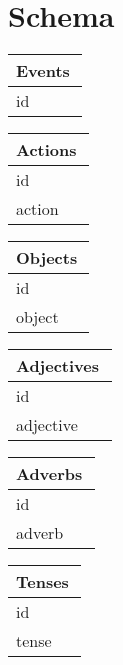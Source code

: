 \documentclass[10pt]{article}
\begin{document}
\section{Schema}
\begin{multicols}{2}

\begin{tabular}{|p{0.95\linewidth}|} 
\hline                   
\textbf{Events}
\\
\hline
id\\
\hline
\end{tabular}



\begin{tabular}{|p{0.95\linewidth}|} 
\hline                   
\textbf{Actions}
\\
\hline
id\\
\hline
action\\
\hline
\end{tabular}



\begin{tabular}{|p{0.95\linewidth}|} 
\hline                   
\textbf{Objects}
\\
\hline
id\\
\hline
object\\
\hline
\end{tabular}




\begin{tabular}{|p{0.95\linewidth}|} 
\hline                   
\textbf{Adjectives}
\\
\hline
id\\
\hline
adjective\\
\hline
\end{tabular}





\begin{tabular}{|p{0.95\linewidth}|} 
\hline                   
\textbf{Adverbs}
\\
\hline
id\\
\hline
adverb\\
\hline
\end{tabular}



\begin{tabular}{|p{0.95\linewidth}|} 
\hline                   
\textbf{Tenses}
\\
\hline
id\\
\hline
tense\\
\hline
\end{tabular}




\end{multicols}
\end{document}
